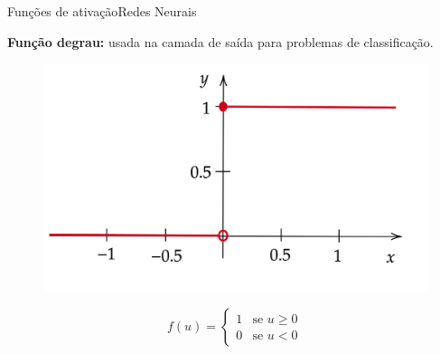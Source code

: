 \documentclass[t]{beamer}
\begin{document}
\begin{ftst}{Funções de ativação}{Redes Neurais}

\textbf{Função degrau:} usada na camada de saída para problemas de classificação.
\begin{figure}
    \centering
    \includegraphics[scale=0.12]{Figuras/degrau.png}
\end{figure}

\begin{equation}
    f(u) = \left\{\begin{matrix} 
    1 & \text{se } u \geq 0\\ 0 & 
    \text{se } u < 0
    \end{matrix}\right.
\end{equation}


\end{ftst}

\end{document}
